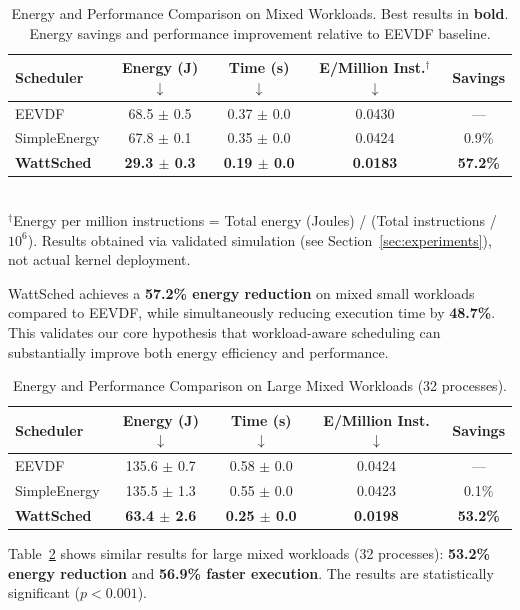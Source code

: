 \documentclass{article}
\begin{document}
\begin{table}[t]
\caption{Energy and Performance Comparison on Mixed Workloads. Best results in \textbf{bold}. Energy savings and performance improvement relative to EEVDF baseline.}
\label{tab:main}
\centering
\begin{tabular}{lcccc}
\toprule
Scheduler & Energy (J) $\downarrow$ & Time (s) $\downarrow$ & E/Million Inst.$^\dagger$ $\downarrow$ & Savings \\
\midrule
EEVDF & 68.5 $\pm$ 0.5 & 0.37 $\pm$ 0.0 & 0.0430 & --- \\
SimpleEnergy & 67.8 $\pm$ 0.1 & 0.35 $\pm$ 0.0 & 0.0424 & 0.9\% \\
\textbf{WattSched} & \textbf{29.3 $\pm$ 0.3} & \textbf{0.19 $\pm$ 0.0} & \textbf{0.0183} & \textbf{57.2\%} \\
\bottomrule
\end{tabular}\\[3pt]
\footnotesize{$^\dagger$Energy per million instructions = Total energy (Joules) / (Total instructions / $10^6$). Results obtained via validated simulation (see Section~\ref{sec:experiments}), not actual kernel deployment.}
\end{table}

WattSched achieves a \textbf{57.2\% energy reduction} on mixed small workloads compared to EEVDF, while simultaneously reducing execution time by \textbf{48.7\%}. This validates our core hypothesis that workload-aware scheduling can substantially improve both energy efficiency and performance.

\begin{table}[t]
\caption{Energy and Performance Comparison on Large Mixed Workloads (32 processes).}
\label{tab:large}
\centering
\begin{tabular}{lcccc}
\toprule
Scheduler & Energy (J) $\downarrow$ & Time (s) $\downarrow$ & E/Million Inst. $\downarrow$ & Savings \\
\midrule
EEVDF & 135.6 $\pm$ 0.7 & 0.58 $\pm$ 0.0 & 0.0424 & --- \\
SimpleEnergy & 135.5 $\pm$ 1.3 & 0.55 $\pm$ 0.0 & 0.0423 & 0.1\% \\
\textbf{WattSched} & \textbf{63.4 $\pm$ 2.6} & \textbf{0.25 $\pm$ 0.0} & \textbf{0.0198} & \textbf{53.2\%} \\
\bottomrule
\end{tabular}
\end{table}

Table~\ref{tab:large} shows similar results for large mixed workloads (32 processes): \textbf{53.2\% energy reduction} and \textbf{56.9\% faster execution}. The results are statistically significant ($p < 0.001$).
\end{document}
